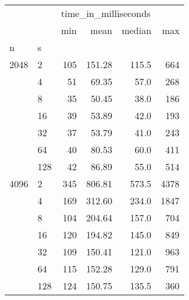 \begin{tabular}{llrrrr}
\toprule
     &     & \multicolumn{4}{l}{time\_in\_milliseconds} \\
     &     &                  min &    mean & median &   max \\
n & s &                      &         &        &       \\
\midrule
2048 & 2   &                  105 &  151.28 &  115.5 &   664 \\
     & 4   &                   51 &   69.35 &   57.0 &   268 \\
     & 8   &                   35 &   50.45 &   38.0 &   186 \\
     & 16  &                   39 &   53.89 &   42.0 &   193 \\
     & 32  &                   37 &   53.79 &   41.0 &   243 \\
     & 64  &                   40 &   80.53 &   60.0 &   411 \\
     & 128 &                   42 &   86.89 &   55.0 &   514 \\
4096 & 2   &                  345 &  806.81 &  573.5 &  4378 \\
     & 4   &                  169 &  312.60 &  234.0 &  1847 \\
     & 8   &                  104 &  204.64 &  157.0 &   704 \\
     & 16  &                  120 &  194.82 &  145.0 &   849 \\
     & 32  &                  109 &  150.41 &  121.0 &   963 \\
     & 64  &                  115 &  152.28 &  129.0 &   791 \\
     & 128 &                  124 &  150.75 &  135.5 &   360 \\
\bottomrule
\end{tabular}
